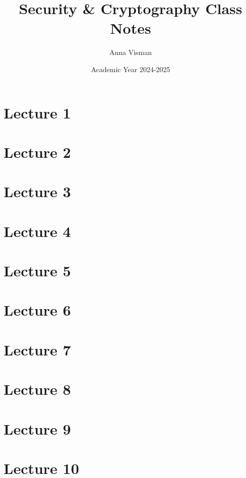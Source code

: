 \documentclass[10pt, oneside]{article}
\title{Security \& Cryptography Class Notes}
\author{Anna Visman}
\date{Academic Year 2024-2025}
\begin{document}
\maketitle
\tableofcontents

\vspace{.25in}

\newpage 
\section{Lecture 1}



\newpage

\section{Lecture 2}



\newpage

\section{Lecture 3}



\newpage

\section{Lecture 4}



\newpage

\section{Lecture 5}



\newpage

\section{Lecture 6}



\newpage

\section{Lecture 7}



\newpage

\section{Lecture 8}



\newpage 
\section{Lecture 9}



\newpage
\section{Lecture 10}


\end{document}
